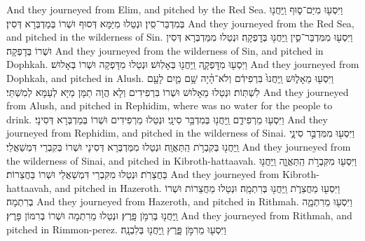 {And they journeyed from Elim, and pitched by the Red Sea.}{}
{וַיִּסְע֖וּ מִיַּם־ס֑וּף וַֽיַּחֲנ֖וּ בְּמִדְבַּר־סִֽין׃}
{וּנְטַלוּ מִיַּמָּא דְּסוּף וּשְׁרוֹ בְּמַדְבְּרָא דְּסִין׃}
{And they journeyed from the Red Sea, and pitched in the wilderness of Sin.}{}
{וַיִּסְע֖וּ מִמִּדְבַּר־סִ֑ין וַֽיַּחֲנ֖וּ בְּדׇפְקָֽה׃}
{וּנְטַלוּ מִמַּדְבְּרָא דְּסִין וּשְׁרוֹ בְּדָפְקָה׃}
{And they journeyed from the wilderness of Sin, and pitched in Dophkah.}{}
{וַיִּסְע֖וּ מִדׇּפְקָ֑ה וַֽיַּחֲנ֖וּ בְּאָלֽוּשׁ׃}
{וּנְטַלוּ מִדָּפְקָה וּשְׁרוֹ בְּאָלוּשׁ׃}
{And they journeyed from Dophkah, and pitched in Alush.}{}
{וַיִּסְע֖וּ מֵאָל֑וּשׁ וַֽיַּחֲנוּ֙ בִּרְפִידִ֔ם וְלֹא־הָ֨יָה שָׁ֥ם מַ֛יִם לָעָ֖ם לִשְׁתּֽוֹת׃}
{וּנְטַלוּ מֵאָלוּשׁ וּשְׁרוֹ בִּרְפִידִים וְלָא הֲוָה תַמָּן מַיָּא לְעַמָּא לְמִשְׁתֵּי׃}
{And they journeyed from Alush, and pitched in Rephidim, where was no water for the people to drink.}{}
{וַיִּסְע֖וּ מֵרְפִידִ֑ם וַֽיַּחֲנ֖וּ בְּמִדְבַּ֥ר סִינָֽי׃}
{וּנְטַלוּ מֵרְפִידִים וּשְׁרוֹ בְּמַדְבְּרָא דְּסִינָי׃}
{And they journeyed from Rephidim, and pitched in the wilderness of Sinai.}{}
{וַיִּסְע֖וּ מִמִּדְבַּ֣ר סִינָ֑י וַֽיַּחֲנ֖וּ בְּקִבְרֹ֥ת הַֽתַּאֲוָֽה׃}
{וּנְטַלוּ מִמַּדְבְּרָא דְּסִינָי וּשְׁרוֹ בְּקִבְרֵי דִּמְשַׁאֲלֵי׃}
{And they journeyed from the wilderness of Sinai, and pitched in Kibroth-hattaavah.}{}
{וַיִּסְע֖וּ מִקִּבְרֹ֣ת הַֽתַּאֲוָ֑ה וַֽיַּחֲנ֖וּ בַּחֲצֵרֹֽת׃}
{וּנְטַלוּ מִקִּבְרֵי דִּמְשַׁאֲלֵי וּשְׁרוֹ בַּחֲצֵרוֹת׃}
{And they journeyed from Kibroth-hattaavah, and pitched in Hazeroth.}{}
{וַיִּסְע֖וּ מֵחֲצֵרֹ֑ת וַֽיַּחֲנ֖וּ בְּרִתְמָֽה׃
}
{וּנְטַלוּ מֵחֲצֵרוֹת וּשְׁרוֹ בְרִתְמָה׃}
{And they journeyed from Hazeroth, and pitched in Rithmah.}{}
{וַיִּסְע֖וּ מֵרִתְמָ֑ה וַֽיַּחֲנ֖וּ בְּרִמֹּ֥ן פָּֽרֶץ׃}
{וּנְטַלוּ מֵרִתְמָה וּשְׁרוֹ בְּרִמּוֹן פָּרֶץ׃}
{And they journeyed from Rithmah, and pitched in Rimmon-perez.}{}
{וַיִּסְע֖וּ מֵרִמֹּ֣ן פָּ֑רֶץ וַֽיַּחֲנ֖וּ בְּלִבְנָֽה׃}

